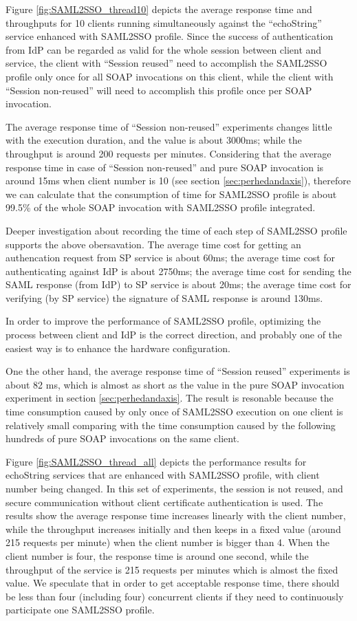 \documentclass[conference]{IEEEtran}
\begin{document}
Figure \ref{fig:SAML2SSO_thread10} depicts the average response time and throughputs for 10 clients
running simultaneously against the ``echoString'' service enhanced with SAML2SSO profile. Since 
the success of authentication from IdP can be regarded as valid for the whole session between client 
and service, the client with ``Session reused'' need to accomplish the SAML2SSO profile only once 
for all SOAP invocations on this client, while the client with ``Session non-reused'' will need to 
accomplish this profile once per SOAP invocation.

The average response time of ``Session non-reused'' experiments changes little with the execution 
duration, and the value is about 3000ms; while the throughput is around 200 requests per minutes.
Considering that the average response time in case of ``Session non-reused'' and pure SOAP invocation 
is around 15ms when client number is 10 (see section \ref{sec:perhedandaxis}), therefore we can 
calculate that the consumption of time for SAML2SSO profile is about 99.5\% of the whole SOAP 
invocation with SAML2SSO profile integrated. 

Deeper investigation about recording the time of each step of SAML2SSO profile supports the 
above obersavation. The average time cost for getting an authencation request from SP service 
is about 60ms; the average time cost for authenticating against IdP is about 2750ms; the 
average time cost for sending the SAML response (from IdP) to SP service is about 20ms;
the average time cost for verifying (by SP service) the signature of SAML response is 
around 130ms.

In order to improve the performance of SAML2SSO profile, optimizing the process between 
client and IdP is the correct direction, and probably one of the easiest way is to enhance the 
hardware configuration.

One the other hand, the average response time of ``Session reused'' experiments is about 82 ms,
which is almost as short as the value in the pure SOAP invocation experiment in section 
\ref{sec:perhedandaxis}. The result is resonable because the time consumption caused by 
only once of SAML2SSO execution on one client is relatively small comparing with the time 
consumption caused by the following hundreds of pure SOAP invocations on the same client.

Figure \ref{fig:SAML2SSO_thread_all} depicts the performance results for echoString services
that are enhanced with SAML2SSO profile, with client number being changed. In this set of experiments, 
the session is not reused, and secure communication without client certificate authentication is used.
The results show the average response time increases linearly with the client number, while the 
throughput increases initially and then keeps in a fixed value (around 215 requests per minute) 
when the client number is bigger than 4. When the client number is four, the response time is 
around one second, while the throughput of the service is 215 requests per minutes which is almost
the fixed value.
We speculate that in order to get acceptable response time, there should be less than four (including four) 
concurrent clients if they need to continuously participate one SAML2SSO profile. 
\end{document}
